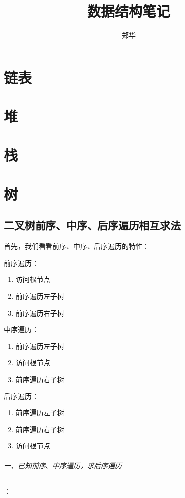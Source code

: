 \documentclass[UTF8,a4paper,12pt]{ctexbook}
\author{\kaishu 郑华}
\title{\heiti 数据结构笔记}
\begin{document}
 	\maketitle
 	\tableofcontents
 	
\chapter{链表}


\chapter{堆}


\chapter{栈}


\chapter{树}
	\section{二叉树前序、中序、后序遍历相互求法}
		首先，我们看看前序、中序、后序遍历的特性： 
		
		前序遍历： 
		\begin{enumerate}[itemindent = 2em]
			\item 访问根节点 
			\item 前序遍历左子树 
			\item 前序遍历右子树
		\end{enumerate}
		
		中序遍历： 
		\begin{enumerate}[itemindent = 2em]
			\item 前序遍历左子树 
			\item 访问根节点 
			\item 前序遍历右子树
		\end{enumerate}
		
		后序遍历： 
		\begin{enumerate}[itemindent = 2em]
			\item 前序遍历左子树 
			\item 前序遍历右子树
			\item 访问根节点 
		\end{enumerate}
		
		\subparagraph{一、已知前序、中序遍历，求后序遍历}：
		
\end{document}

